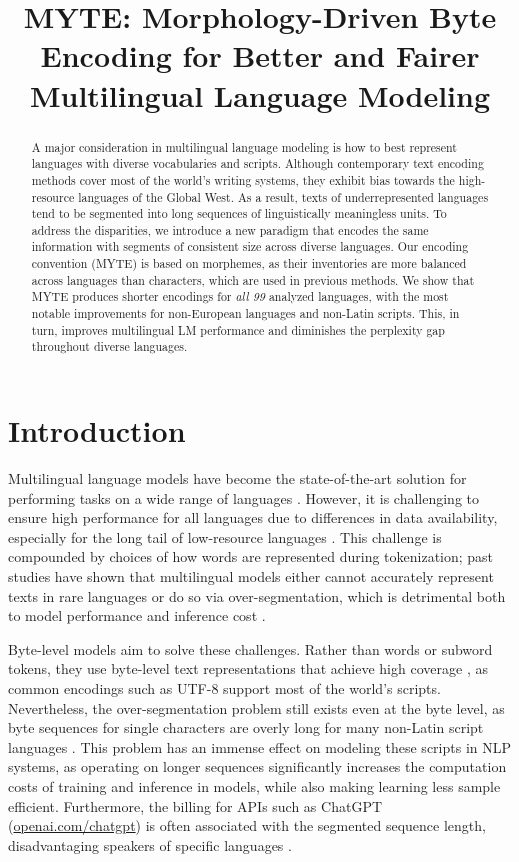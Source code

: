 \title{MYTE: Morphology-Driven Byte Encoding for Better and Fairer Multilingual Language Modeling}

\begin{abstract}
A major consideration in multilingual language modeling is how to best represent languages with diverse vocabularies and scripts. Although contemporary text encoding methods cover most of the world's writing systems, they exhibit bias towards the high-resource languages of the Global West. As a result, texts of underrepresented languages tend to be segmented into long sequences of linguistically meaningless units. To address the disparities, we introduce a new paradigm that encodes the same information with segments of consistent size across diverse languages. Our encoding convention (\textsc{MYTE})
is based on morphemes, as their inventories are more balanced across languages than characters, which are used in previous methods. We show that \textsc{MYTE} produces shorter encodings for \textit{all 99} analyzed languages, with the most notable improvements for non-European languages and non-Latin scripts. This, in turn, improves multilingual LM performance and diminishes the perplexity gap throughout diverse languages.
\end{abstract}

\section{Introduction}

Multilingual language models have become the state-of-the-art solution for performing tasks on a wide range of languages \cite{devlin-etal-2019-bert, conneau-etal-2020-unsupervised, xue-etal-2021-mt5}. However, it is challenging to ensure high performance for all languages due to differences in data availability, especially for the long tail of low-resource languages \cite{malkin-etal-2022-balanced}. This challenge is compounded by choices of how words are represented during tokenization; past studies have shown that multilingual models either cannot accurately represent texts in rare languages \cite{pfeiffer-etal-2021-unks} or do so via over-segmentation, which is detrimental both to model performance and inference cost \cite{petrov_language_2023, ahia_all_2023}. 

Byte-level models aim to solve these challenges. Rather than words or subword tokens, they use byte-level text representations that achieve high coverage \cite{xue_byt5_2022}, as common encodings such as UTF-8 support most of the world's scripts. Nevertheless, the over-segmentation problem still exists even at the byte level, as byte sequences for single characters are overly long for many non-Latin script languages \cite{arnett2024bit}. This problem has an immense effect on modeling these scripts in NLP systems, as operating on longer sequences significantly increases the computation costs of training and inference in models, while also making learning less sample efficient. Furthermore, the billing for APIs such as ChatGPT (\url{openai.com/chatgpt})
is often associated with the segmented sequence length, disadvantaging speakers of specific languages \cite{ahia_all_2023}. 

